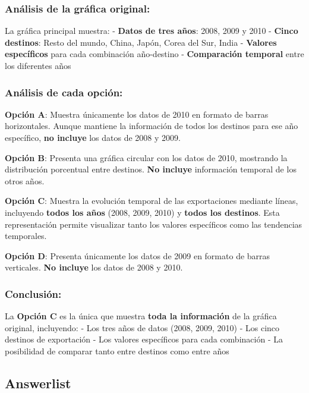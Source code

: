 \documentclass[
]{article}
\begin{document}
\subsubsection{Análisis de la gráfica
original:}\label{anuxe1lisis-de-la-gruxe1fica-original}

La gráfica principal muestra: - \textbf{Datos de tres años}: 2008, 2009
y 2010 - \textbf{Cinco destinos}: Resto del mundo, China, Japón, Corea
del Sur, India - \textbf{Valores específicos} para cada combinación
año-destino - \textbf{Comparación temporal} entre los diferentes años

\subsubsection{Análisis de cada
opción:}\label{anuxe1lisis-de-cada-opciuxf3n}

\textbf{Opción A}: Muestra únicamente los datos de 2010 en formato de
barras horizontales. Aunque mantiene la información de todos los
destinos para ese año específico, \textbf{no incluye} los datos de 2008
y 2009.

\textbf{Opción B}: Presenta una gráfica circular con los datos de 2010,
mostrando la distribución porcentual entre destinos. \textbf{No incluye}
información temporal de los otros años.

\textbf{Opción C}: Muestra la evolución temporal de las exportaciones
mediante líneas, incluyendo \textbf{todos los años} (2008, 2009, 2010) y
\textbf{todos los destinos}. Esta representación permite visualizar
tanto los valores específicos como las tendencias temporales.

\textbf{Opción D}: Presenta únicamente los datos de 2009 en formato de
barras verticales. \textbf{No incluye} los datos de 2008 y 2010.

\subsubsection{Conclusión:}\label{conclusiuxf3n}

La \textbf{Opción C} es la única que muestra \textbf{toda la
información} de la gráfica original, incluyendo: - Los tres años de
datos (2008, 2009, 2010) - Los cinco destinos de exportación - Los
valores específicos para cada combinación - La posibilidad de comparar
tanto entre destinos como entre años

\subsection{Answerlist}\label{answerlist-1}
\end{document}
